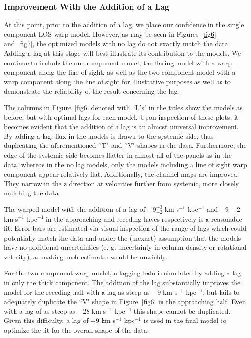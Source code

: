 \documentclass{emulateapj}
\begin{document}
     
\subsubsection{Improvement With the Addition of a Lag} \label{Section4.2.5}

\par
     At this point, prior to the addition of a lag, we place our confidence in the single component LOS warp model.  However, as may be seen in Figures~\ref{fig6} and~\ref{fig7}, the optimized models with no lag do not exactly match the data.  Adding a lag at this stage will best illustrate its contribution to the models.  We continue to include the one-component model, the flaring model with a warp component along the line of sight, as well as the two-component model with a warp component along the line of sight for illustrative purposes as well as to demonstrate the reliability of the result concerning the lag.
      
\par
    The columns in Figure~\ref{fig6} denoted with ``L's" in the titles show the models as before, but with optimal lags for each model.  Upon inspection of these plots, it becomes evident that the addition of a lag is an almost universal improvement. By adding a lag, flux in the models is drawn to the systemic side, thus duplicating the aforementioned ``T" and ``V" shapes in the data.  Furthermore, the edge of the systemic side becomes flatter in almost all of the panels as in the data, whereas in the no lag models, only the models including a line of sight warp component appear relatively flat.  Additionally, the channel maps are improved.  They narrow in the z direction at velocities further from systemic, more closely matching the data.

\par     
      The warped model with the addition of a lag of $-9^{+3}_{-2}$ km s$^{-1}$ kpc$^{-1}$ and $-9\pm$2 km s$^{-1}$ kpc$^{-1}$ in the approaching and receding haves respectively is a reasonable fit.  Error bars are estimated via visual inspection of the range of lags which could potentially match the data and under the (inexact) assumption that the models have no additional uncertainties (e. g. uncertainty in column density or rotational velocity), as making such estimates would be unwieldy. 

\par
     For the two-component warp model, a lagging halo is simulated by adding a lag in only the thick component.  The addition of the lag substantially improves the model for the receding half with a lag as steep as $-9$ km s$^{-1}$ kpc$^{-1}$, but fails to adequately duplicate the ``V" shape in Figure~\ref{fig6} in the approaching half. Even with a lag of as steep as $-$28 km s$^{-1}$ kpc$^{-1}$ this shape cannot be duplicated. Given this difficulty, a lag of $-9$ km s$^{-1}$ kpc$^{-1}$ is used in the final model to optimize the fit for the overall shape of the data.
\end{document}
